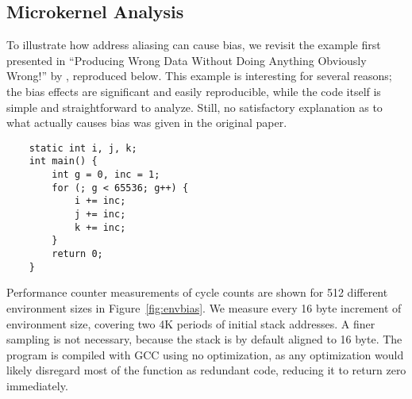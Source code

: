 \documentclass[prodmode,acmtaco]{acmsmall}
\begin{document}
\subsection{Microkernel Analysis}
\label{sec:microkernel}
To illustrate how address aliasing can cause bias, we revisit the example first presented in ``Producing Wrong Data Without Doing Anything Obviously Wrong!'' by , reproduced below. 
This example is interesting for several reasons; the bias effects are significant and easily reproducible, while the code itself is simple and straightforward to analyze.
Still, no satisfactory explanation as to what actually causes bias was given in the original paper.

\begin{lstlisting}
    static int i, j, k;
    int main() {
        int g = 0, inc = 1;
        for (; g < 65536; g++) {
            i += inc;
            j += inc;
            k += inc; 
        }
        return 0;
    }
\end{lstlisting}

\begin{figure*}[t]
  \caption{Bias from environment size for microkernel. Measured average of 10 cycle count samples for 512 different environments. Spikes show aliasing case, occurring once for each 4K period}
  \label{fig:envbias}
\end{figure*}

Performance counter measurements of cycle counts are shown for 512 different environment sizes in Figure~\ref{fig:envbias}.
We measure every 16 byte increment of environment size, covering two 4K periods of initial stack addresses.
A finer sampling is not necessary, because the stack is by default aligned to 16 byte.
The program is compiled with {\small{GCC}} using no optimization, as any optimization would likely disregard most of the function as redundant code, reducing it to return zero immediately.
\end{document}
